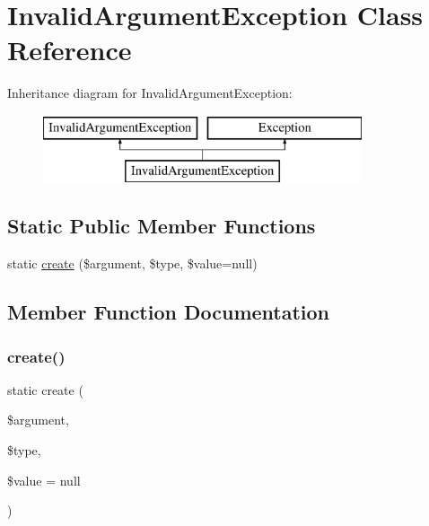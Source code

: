 \hypertarget{class_sebastian_bergmann_1_1_code_coverage_1_1_invalid_argument_exception}{}\section{Invalid\+Argument\+Exception Class Reference}
\label{class_sebastian_bergmann_1_1_code_coverage_1_1_invalid_argument_exception}
Inheritance diagram for Invalid\+Argument\+Exception\+:\begin{figure}[H]
\begin{center}
\leavevmode
\includegraphics[height=2.000000cm]{class_sebastian_bergmann_1_1_code_coverage_1_1_invalid_argument_exception}
\end{center}
\end{figure}
\subsection*{Static Public Member Functions}
\begin{DoxyCompactItemize}
\item 
static \mbox{\hyperlink{class_sebastian_bergmann_1_1_code_coverage_1_1_invalid_argument_exception_a08e2f8e8547ab6eaf0f1da16a4dd2a40}{create}} (\$argument, \$type, \$value=null)
\end{DoxyCompactItemize}


\subsection{Member Function Documentation}
\mbox{\label{class_sebastian_bergmann_1_1_code_coverage_1_1_invalid_argument_exception_a08e2f8e8547ab6eaf0f1da16a4dd2a40}} 
\subsubsection{\texorpdfstring{create()}{create()}}
{\footnotesize\ttfamily static create (\begin{DoxyParamCaption}\item[{}]{\$argument,  }\item[{}]{\$type,  }\item[{}]{\$value = {\ttfamily null} }\end{DoxyParamCaption})\hspace{0.3cm}{\ttfamily [static]}}


